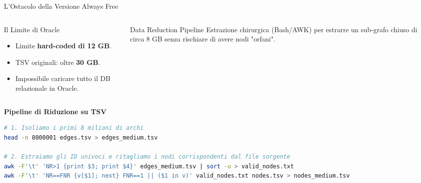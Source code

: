 \documentclass[aspectratio=169]{beamer}
\begin{document}
\begin{frame}[fragile]{L'Ostacolo della Versione Always Free}
    \begin{columns}[T]
        \begin{column}{0.48\textwidth}
            \begin{alertblock}{\faBan \hspace{0.2cm} Il Limite di Oracle}
                \small
                \begin{itemize}
                    \item Limite \textbf{hard-coded di 12 GB}.
                    \item TSV originali: oltre \textbf{30 GB}.
                    \item Impossibile caricare tutto il DB relazionale in Oracle.
                \end{itemize}
            \end{alertblock}
        \end{column}
        
        \begin{column}{0.48\textwidth}
            \begin{block}{\faLightbulb \hspace{0.2cm} Data Reduction Pipeline}
                \small
                Estrazione chirurgica (Bash/AWK) per estrarre un sub-grafo chiuso di circa 8 GB senza rischiare di avere nodi "orfani".
            \end{block}
        \end{column}
    \end{columns}
    
    \vspace{0.3cm}
    \textbf{\faTerminal \hspace{0.2cm} Pipeline di Riduzione su TSV}
    \begin{lstlisting}[language=bash, basicstyle=\ttfamily\tiny]
# 1. Isoliamo i primi 8 milioni di archi
head -n 8000001 edges.tsv > edges_medium.tsv

# 2. Estraiamo gli ID univoci e ritagliamo i nodi corrispondenti dal file sorgente
awk -F'\t' 'NR>1 {print $3; print $4}' edges_medium.tsv | sort -u > valid_nodes.txt
awk -F'\t' 'NR==FNR {v[$1]; next} FNR==1 || ($1 in v)' valid_nodes.txt nodes.tsv > nodes_medium.tsv
    \end{lstlisting}
\end{frame}
\end{document}
